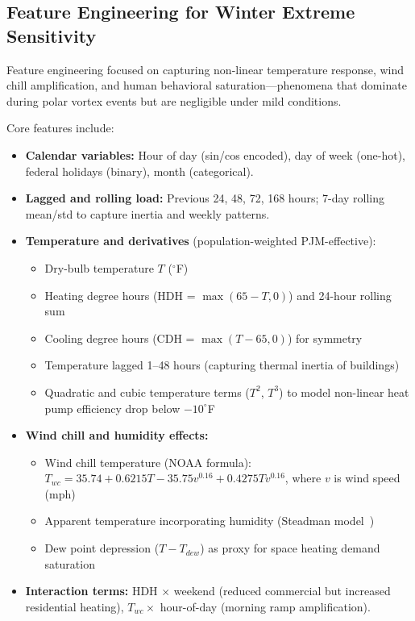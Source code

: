 \documentclass[12pt,a4paper]{article}
\begin{document}
\subsection{Feature Engineering for Winter Extreme Sensitivity}

Feature engineering focused on capturing non-linear temperature response, wind chill amplification, and human behavioral saturation---phenomena that dominate during polar vortex events but are negligible under mild conditions.

Core features include:
\begin{itemize}[leftmargin=*,nosep]
    \item \textbf{Calendar variables:} Hour of day (sin/cos encoded), day of week (one-hot), federal holidays (binary), month (categorical).
    \item \textbf{Lagged and rolling load:} Previous 24, 48, 72, 168 hours; 7-day rolling mean/std to capture inertia and weekly patterns.
    \item \textbf{Temperature and derivatives} (population-weighted PJM-effective):
    \begin{itemize}[nosep]
        \item Dry-bulb temperature $T$ ($^\circ$F)
        \item Heating degree hours (HDH = $\max(65 - T, 0)$) and 24-hour rolling sum
        \item Cooling degree hours (CDH = $\max(T - 65, 0)$) for symmetry
        \item Temperature lagged 1--48 hours (capturing thermal inertia of buildings)
        \item Quadratic and cubic temperature terms ($T^2$, $T^3$) to model non-linear heat pump efficiency drop below $-10^\circ$F
    \end{itemize}
    \item \textbf{Wind chill and humidity effects:}
    \begin{itemize}[nosep]
        \item Wind chill temperature (NOAA formula): $T_{wc} = 35.74 + 0.6215T - 35.75v^{0.16} + 0.4275T v^{0.16}$, where $v$ is wind speed (mph)
        \item Apparent temperature incorporating humidity (Steadman model~\cite{bennett2014autoregressive})
        \item Dew point depression ($T - T_{dew}$) as proxy for space heating demand saturation
    \end{itemize}
    \item \textbf{Interaction terms:} HDH $\times$ weekend (reduced commercial but increased residential heating), $T_{wc} \times$ hour-of-day (morning ramp amplification).
\end{itemize}
\end{document}
